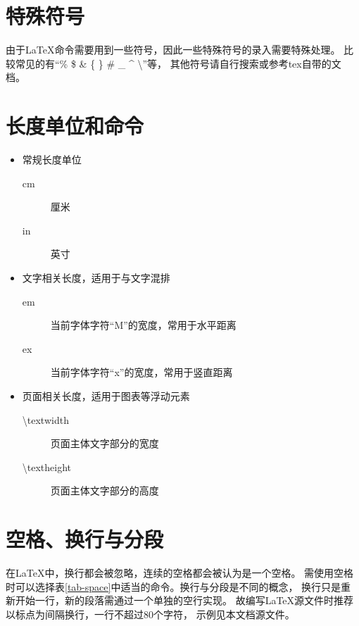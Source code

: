 \section{特殊符号}
\label{sec-symbol}

由于\LaTeX{}命令需要用到一些符号，因此一些特殊符号的录入需要特殊处理。
比较常见的有“\% \$ \& \{ \} \# \_ \^{} \textbackslash”等，
其他符号请自行搜索或参考tex自带的文档。

\section{长度单位和命令}
\label{sec-length}

\begin{itemize}
    \item 常规长度单位
    \begin{description}
        \item[cm] 厘米
        \item[in] 英寸
    \end{description}
    \item 文字相关长度，适用于与文字混排
    \begin{description}
        \item[em] 当前字体字符“M”的宽度，常用于水平距离
        \item[ex] 当前字体字符“x”的宽度，常用于竖直距离
    \end{description}
    \item 页面相关长度，适用于图表等浮动元素
    \begin{description}
        \item[\textbackslash textwidth]  页面主体文字部分的宽度
        \item[\textbackslash textheight] 页面主体文字部分的高度
    \end{description}
\end{itemize}

\section{空格、换行与分段}
\label{sec-space-linkbreak-par}

在\LaTeX{}中，换行都会被忽略，连续的空格都会被认为是一个空格。
需使用空格时可以选择表\ref{tab-space}中适当的命令。换行与分段是不同的概念，
换行只是重新开始一行，新的段落需通过一个单独的空行实现。
故编写\LaTeX{}源文件时推荐以标点为间隔换行，一行不超过80个字符，
示例见本文档源文件。

